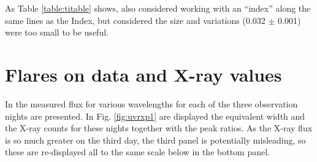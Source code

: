 \begin{table}[!htbp]
\centering
{}
\caption{Results for calculation of median and standard deviation of the equivalent widths of the TiO transition at 6572.468{\AA} to
6573.288{\AA} from \harps. The observations are separated where they are 300 or more days apart.}
\protect\label{table:titable}
\end{table}

As Table \ref{table:titable} shows, {\Firstp} also considered working with an ``index'' along the same lines as the {\ha}
Index, but considered the size and variations (0.032 $\pm$ 0.001) were too small to be useful.

\section{Flares on {\uves} data and X-ray values}
\protect\label{section:uvesflares}

In \citet[fig. 1 to fig. 3]{fuhrmeister11} the measured flux for various wavelengths for each of the three observation
nights are presented. In Fig. \ref{fig:uvrxp1} are displayed the {\ha} equivalent width and the X-ray counts for these
nights together with the peak ratios. As the X-ray flux is so much greater on the third day, the third panel is
potentially misleading, so these are re-displayed all to the same scale below in the bottom panel.


